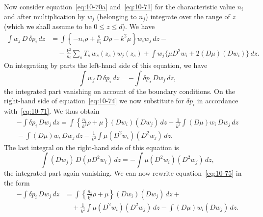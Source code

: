 Now consider equation~\eqref{eq:10-70a} and~\eqref{eq:10-71} for the characteristic value $n_i$ and after multiplication by $w_j$ (belonging to $n_j$) integrate over the range of $z$ (which we shall assume to be $0 \leqslant z \leqslant d$). We have
\begin{align}
\label{eq:10-73}
\int w_j\,D\,\delta p_i\,dz &= \int\left\{-n_i\rho+\frac{g}{n_i}\,D\rho - k^2\mu\right\}w_iw_j\,dz - \nonumber\\
&\quad -\frac{k^2}{n_i}\sum_s T_s\,w_s(z_s)w_j(z_s) + \int w_j\{\mu D^2w_i+2(D\mu)(Dw_i)\}\,dz.
\end{align}
On integrating by parts the left-hand side of this equation, we have
\begin{equation}
\label{eq:10-74}
\int w_j\,D\,\delta p_i\,dz = -\int\delta p_i\,Dw_j\,dz,
\end{equation}
the integrated part vanishing on account of the boundary conditions. On the right-hand side of equation~\eqref{eq:10-74} we now substitute for $\delta p_i$ in accordance with~\eqref{eq:10-71}. We thus obtain
\begin{align}
\label{eq:10-75}
-\int\delta p_i\,Dw_j\,dz = \int\left\{\frac{n_i}{k^2}\rho+\mu\right\}(Dw_i)(Dw_j)\,dz - \frac{1}{k^2}\int(D\mu)w_i\,Dw_j\,dz \nonumber\\
{} - \int(D\mu)w_i\,Dw_j\,dz - \frac{1}{k^2}\int\mu(D^2w_i)(D^2w_j)\,dz.
\end{align}
The last integral on the right-hand side of this equation is
\begin{equation}
\label{eq:10-76}
\int(Dw_j)\,D(\mu D^2w_i)\,dz = -\int\mu(D^2w_i)(D^2w_j)\,dz,
\end{equation}
the integrated part again vanishing. We can now rewrite equation~\eqref{eq:10-75} in the form
\begin{align}
\label{eq:10-77}
-\int\delta p_i\,Dw_j\,dz &= \int\left\{\frac{n_i}{k^2}\rho+\mu\right\}(Dw_i)(Dw_j)\,dz + \nonumber\\
&\quad + \frac{1}{k^2}\int\mu(D^2w_i)(D^2w_j)\,dz - \int(D\mu)w_i(Dw_j)\,dz.
\end{align}


